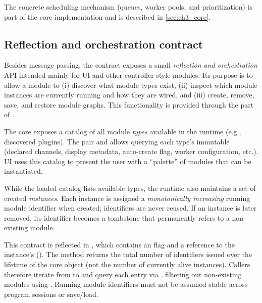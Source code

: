 The concrete scheduling mechanism (queues, worker pools, and prioritization) is part of the core implementation and is described in \autoref{sec:ch3_core}.



\subsection{Reflection and orchestration contract} \label{subsec:ch3_reflection_orchestration}

Besides message passing, the contract exposes a small \emph{reflection and orchestration} API intended mainly for UI and other controller-style modules. Its purpose is to allow a module to (i) discover what module types exist, (ii) inspect which module instances are currently running and how they are wired, and (iii) create, remove, save, and restore module graphs. This functionality is provided through the  part of .

The core exposes a catalog of all module \emph{types} available in the runtime (e.g., discovered plugins). The pair  and  allows querying each type's immutable  (declared channels, display metadata, auto-create flag, worker configuration, etc.). UI uses this catalog to present the user with a ``palette'' of modules that can be instantiated.

While the loaded catalog lists available types, the runtime also maintains a set of created \emph{instances}. Each instance is assigned a \emph{monotonically increasing} running module identifier when created; identifiers are never reused. If an instance is later removed, its identifier becomes a tombstone that permanently refers to a non-existing module.

This contract is reflected in , which contains an  flag and a reference to the instance's  (). The method  returns the total number of identifiers issued over the lifetime of the core object (not the number of currently alive instances). Callers therefore iterate  from  to  and query each entry via , filtering out non-existing modules using . Running module identifiers must not be assumed stable across program sessions or save/load.

